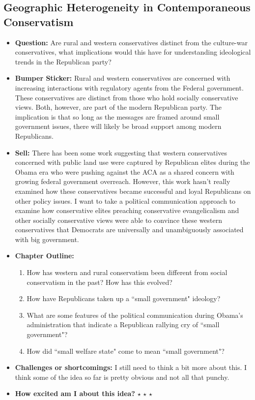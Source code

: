 \documentclass[12pt]{article}
\begin{document}
\subsection{Geographic Heterogeneity in Contemporaneous Conservatism}
    \begin{itemize}
        \item \textbf{Question:} Are rural and western conservatives distinct from the culture-war conservatives, what implications would this have for understanding ideological trends in the Republican party?
        \item \textbf{Bumper Sticker:} Rural and western conservatives are concerned with increasing interactions with regulatory agents from the Federal government. These conservatives are distinct from those who hold socially conservative views. Both, however, are part of the modern Republican party. The implication is that so long as the messages are framed around small government issues, there will likely be broad support among modern Republicans.
        \item \textbf{Sell:} There has been some work suggesting that western conservatives concerned with public land use were captured by Republican elites during the Obama era who were pushing against the ACA as a shared concern with growing federal government overreach. However, this work hasn't really examined how these conservatives became successful and loyal Republicans on other policy issues. I want to take a political communication approach to examine how conservative elites preaching conservative evangelicalism and other socially conservative views were able to convince these western conservatives that Democrats are universally and unambiguously associated with big government.
        \item \textbf{Chapter Outline:}
        \begin{enumerate}
            \item How has western and rural conservatism been different from social conservatism in the past? How has this evolved?
            \item How have Republicans taken up a ``small government" ideology?
            \item What are some features of the political communication during Obama's administration that indicate a Republican rallying cry of ``small government"?
            \item How did ``small welfare state" come to mean ``small government"?
        \end{enumerate}
        \item \textbf{Challenges or shortcomings:} I still need to think a bit more about this. I think some of the idea so far is pretty obvious and not all that punchy.
        \item \textbf{How excited am I about this idea?} $\star$ $\star$ $\star$
    \end{itemize}
\end{document}
